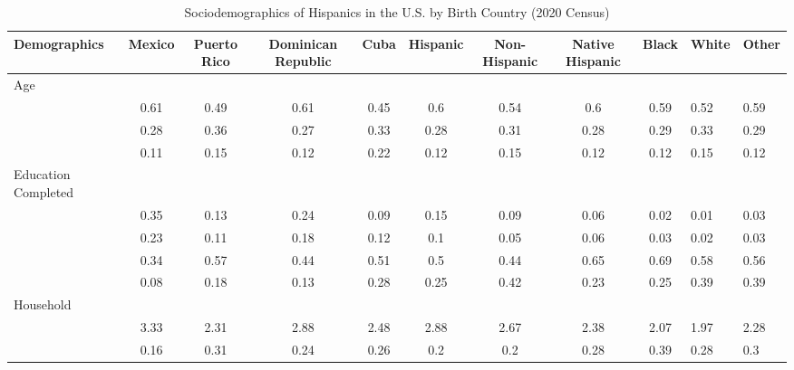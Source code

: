 \begin{table}[ht]
\centering
\caption{Sociodemographics of Hispanics in the U.S. by Birth Country (2020 Census)} 
\begingroup\small
\begin{tabular}{>{\raggedright\arraybackslash}p{3.2cm}|cccccccc}
  \hline
Demographics & Mexico & Puerto Rico & Dominican Republic & Cuba & Hispanic & Non-Hispanic & Native Hispanic  & Black & White & Other \\ 
  \hline
Age &  &  &  &  &  &  &  &  &  &  \\ 
  & 0.61 & 0.49 & 0.61 & 0.45 & 0.6 & 0.54 & 0.6 & 0.59 & 0.52 & 0.59 \\ 
  & 0.28 & 0.36 & 0.27 & 0.33 & 0.28 & 0.31 & 0.28 & 0.29 & 0.33 & 0.29 \\ 
  & 0.11 & 0.15 & 0.12 & 0.22 & 0.12 & 0.15 & 0.12 & 0.12 & 0.15 & 0.12 \\ 
  Education Completed &  &  &  &  &  &  &  &  &  &  \\ 
  & 0.35 & 0.13 & 0.24 & 0.09 & 0.15 & 0.09 & 0.06 & 0.02 & 0.01 & 0.03 \\ 
  & 0.23 & 0.11 & 0.18 & 0.12 & 0.1 & 0.05 & 0.06 & 0.03 & 0.02 & 0.03 \\ 
  & 0.34 & 0.57 & 0.44 & 0.51 & 0.5 & 0.44 & 0.65 & 0.69 & 0.58 & 0.56 \\ 
  & 0.08 & 0.18 & 0.13 & 0.28 & 0.25 & 0.42 & 0.23 & 0.25 & 0.39 & 0.39 \\ 
  Household &  &  &  &  &  &  &  &  &  &  \\ 
  & 3.33 & 2.31 & 2.88 & 2.48 & 2.88 & 2.67 & 2.38 & 2.07 & 1.97 & 2.28 \\ 
  & 0.16 & 0.31 & 0.24 & 0.26 & 0.2 & 0.2 & 0.28 & 0.39 & 0.28 & 0.3 \\ 

\end{tabular}
\end{table}
